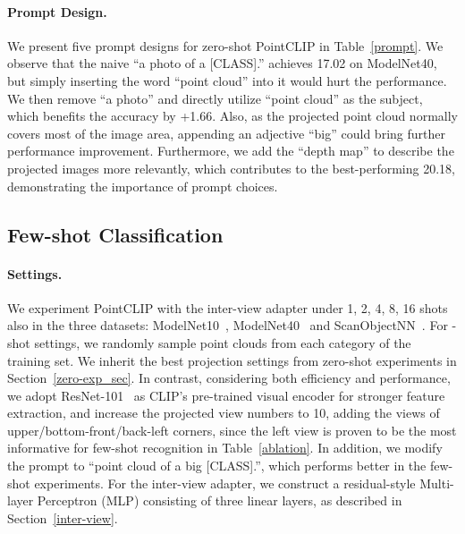 \documentclass[10pt,twocolumn,letterpaper]{article}
\begin{document}
\vspace*{-8pt}
\paragraph{Prompt Design.} We present five prompt designs for zero-shot PointCLIP in Table~\ref{prompt}. We observe that the naive ``a photo of a [CLASS].'' achieves 17.02 on ModelNet40, but simply inserting the word ``point cloud'' into it would hurt the performance. We then remove ``a photo'' and directly utilize ``point cloud'' as the subject, which benefits the accuracy by +1.66. Also, as the projected point cloud normally covers most of the image area, appending an adjective ``big'' could bring further performance improvement. Furthermore, we add the ``depth map'' to describe the projected images more relevantly, which contributes to the best-performing 20.18, demonstrating the importance of prompt choices.
\label{Prompt Design}


\vspace*{1pt}
\subsection{Few-shot Classification}
\paragraph{Settings.} We experiment PointCLIP with the inter-view adapter under 1, 2, 4, 8, 16 shots also in the three datasets: ModelNet10~\cite{wu20153d}, ModelNet40~\cite{wu20153d} and ScanObjectNN~\cite{uy2019revisiting}. For -shot settings, we randomly sample  point clouds from each category of the training set. We inherit the best projection settings from zero-shot experiments in Section~\ref{zero-exp_sec}. In contrast, considering both efficiency and performance, we adopt ResNet-101~\cite{he2016deep} as CLIP's pre-trained visual encoder for stronger feature extraction, and increase the projected view numbers to 10, adding the views of upper/bottom-front/back-left corners, since the left view is proven to be the most informative for few-shot recognition in Table~\ref{ablation}. In addition, we modify the prompt to ``point cloud of a big [CLASS].'', which performs better in the few-shot experiments. For the inter-view adapter, we construct a residual-style Multi-layer Perceptron (MLP) consisting of three linear layers, as described in Section~\ref{inter-view}.



\vspace*{-8pt}
\end{document}
